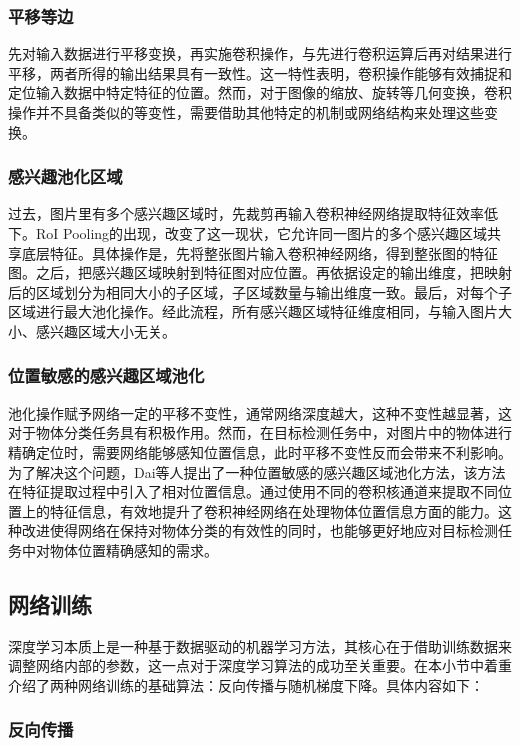 \subsubsection{平移等边}
先对输入数据进行平移变换，再实施卷积操作，与先进行卷积运算后再对结果进行平移，两者所得的输出结果具有一致性。这一特性表明，卷积操作能够有效捕捉和定位输入数据中特定特征的位置。然而，对于图像的缩放、旋转等几何变换，卷积操作并不具备类似的等变性，需要借助其他特定的机制或网络结构来处理这些变换。


\subsubsection{感兴趣池化区域}

过去，图片里有多个感兴趣区域时，先裁剪再输入卷积神经网络提取特征效率低下。RoI Pooling的出现，改变了这一现状，它允许同一图片的多个感兴趣区域共享底层特征。具体操作是，先将整张图片输入卷积神经网络，得到整张图的特征图。之后，把感兴趣区域映射到特征图对应位置。再依据设定的输出维度，把映射后的区域划分为相同大小的子区域，子区域数量与输出维度一致。最后，对每个子区域进行最大池化操作。经此流程，所有感兴趣区域特征维度相同，与输入图片大小、感兴趣区域大小无关。



\subsubsection{位置敏感的感兴趣区域池化}

池化操作赋予网络一定的平移不变性，通常网络深度越大，这种不变性越显著，这对于物体分类任务具有积极作用。然而，在目标检测任务中，对图片中的物体进行精确定位时，需要网络能够感知位置信息，此时平移不变性反而会带来不利影响。为了解决这个问题，Dai等人提出了一种位置敏感的感兴趣区域池化方法，该方法在特征提取过程中引入了相对位置信息。通过使用不同的卷积核通道来提取不同位置上的特征信息，有效地提升了卷积神经网络在处理物体位置信息方面的能力。这种改进使得网络在保持对物体分类的有效性的同时，也能够更好地应对目标检测任务中对物体位置精确感知的需求。


\subsection{网络训练}
深度学习本质上是一种基于数据驱动的机器学习方法，其核心在于借助训练数据来调整网络内部的参数，这一点对于深度学习算法的成功至关重要。在本小节中着重介绍了两种网络训练的基础算法：反向传播与随机梯度下降。具体内容如下：

\subsubsection{反向传播}

